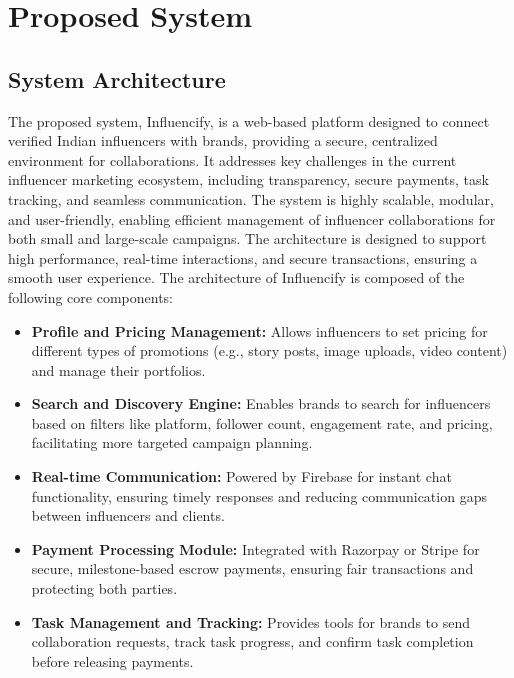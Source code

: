 \chapter{Proposed System}
\begin{justify}
    
\section{System Architecture}
The proposed system, Influencify, is a web-based platform designed to connect verified Indian influencers with brands, providing a secure, centralized environment for collaborations. It addresses key challenges in the current influencer marketing ecosystem, including transparency, secure payments, task tracking, and seamless communication. The system is highly scalable, modular, and user-friendly, enabling efficient management of influencer collaborations for both small and large-scale campaigns. The architecture is designed to support high performance, real-time interactions, and secure transactions, ensuring a smooth user experience.
The architecture of Influencify is composed of the following core components:
\begin{itemize}
    \item \textbf{Profile and Pricing Management:} Allows influencers to set pricing for different types of promotions (e.g., story posts, image uploads, video content) and manage their portfolios.
    
    \item \textbf{Search and Discovery Engine:} Enables brands to search for influencers based on filters like platform, follower count, engagement rate, and pricing, facilitating more targeted campaign planning.
    
    \item \textbf{Real-time Communication:} Powered by Firebase for instant chat functionality, ensuring timely responses and reducing communication gaps between influencers and clients.
    
    \item \textbf{Payment Processing Module:} Integrated with Razorpay or Stripe for secure, milestone-based escrow payments, ensuring fair transactions and protecting both parties.
    
    \item \textbf{Task Management and Tracking:} Provides tools for brands to send collaboration requests, track task progress, and confirm task completion before releasing payments.
    

\end{itemize}
\end{justify}
